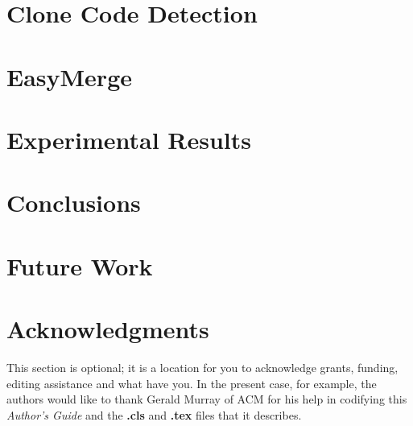 \documentclass{acm_proc_article-sp}
\begin{document}
\section{Clone Code Detection}

\section{EasyMerge}

\section{Experimental Results}

\section{Conclusions}

\section{Future Work}

\section{Acknowledgments}
This section is optional; it is a location for you
to acknowledge grants, funding, editing assistance and
what have you.  In the present case, for example, the
authors would like to thank Gerald Murray of ACM for
his help in codifying this \textit{Author's Guide}
and the \textbf{.cls} and \textbf{.tex} files that it describes.

%

%
%
\end{document}
